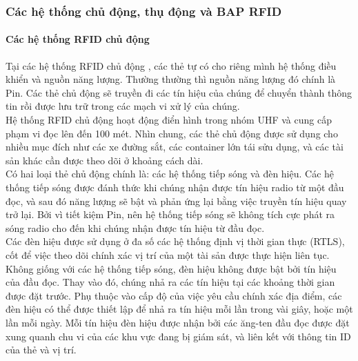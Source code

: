 \subsubsection{Các hệ thống chủ động, thụ động và BAP RFID}
\paragraph{Các hệ thống RFID chủ động}
Tại các hệ thống RFID chủ động , các thẻ tự có cho riêng mình hệ thống điều khiển và nguồn năng lượng. Thường  thường thì nguồn năng lượng đó chính là Pin. Các thẻ chủ động sẽ truyền đi các tín hiệu của chúng để chuyển thành thông tin rồi được lưu trữ trong các mạch vi xử lý của chúng.\\
Hệ thống RFID chủ động hoạt động điển hình trong nhóm UHF và cung cấp phạm vi đọc lên đến 100 mét. Nhìn chung, các thẻ chủ động được sử dụng cho nhiều mục đích như các xe đường sắt, các container lớn tái sửu dụng, và các tài sản khác cần được theo dõi ở khoảng cách dài.\\
Có hai loại thẻ chủ động chính là: các hệ thống tiếp sóng và đèn hiệu. Các hệ thống tiếp sóng được đánh thức khi chúng nhận được tín hiệu radio từ một đầu đọc,  và sau đó năng lượng sẽ bật và phản ứng lại bằng việc truyền tín hiệu quay trở lại. Bởi vì tiết kiệm Pin,  nên hệ thống tiếp sóng sẽ không tích cực phát ra sóng radio cho đến khi chúng nhận được tín hiệu từ đầu đọc.\\
Các đèn hiệu được sử dụng ở đa số các hệ thống định vị thời gian thực (RTLS), cốt để việc theo dõi chính xác vị trí của một tài sản được thực hiện liên tục. Không giống với các hệ thống tiếp sóng,  đèn hiệu không được bật bởi tín hiệu của đầu đọc. Thay vào đó,  chúng nhả ra các tín hiệu tại các khoảng thời gian được đặt trước. Phụ thuộc vào cấp độ của việc yêu cầu chính xác địa điểm, các đèn hiệu có thể được thiết lập để nhả ra tín hiệu mỗi lần trong vài giây,  hoặc một lần mỗi ngày. Mỗi tín hiệu đèn hiệu được nhận bởi các ăng-ten đầu đọc được đặt xung quanh chu vi của các khu vực đang bị giám sát, và liên kết với thông tin ID của thẻ và vị trí.
